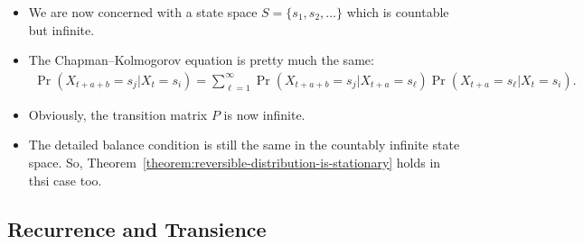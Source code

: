 \documentclass[10pt]{article}
\begin{document}
\begin{itemize}
  \item We are now concerned with a state space $S = \{ s_1, s_2, \dotsc \}$ which is countable but infinite.
  
  \item The Chapman--Kolmogorov equation is pretty much the same:
  \begin{align*}
      \Pr(X_{t+a+b}=s_j|X_t=s_i)
      = \sum_{\ell=1}^\infty \Pr(X_{t+a+b}=s_j|X_{t+a}=s_\ell) \Pr(X_{t+a}=s_\ell|X_{t}=s_i).
  \end{align*}

  \item Obviously, the transition matrix $P$ is now infinite.
  
  \item The detailed balance condition is still the same in the countably infinite state space. So, Theorem~\ref{theorem:reversible-distribution-is-stationary} holds in thsi case too.
\end{itemize}

\subsection{Recurrence and Transience}
\end{document}
